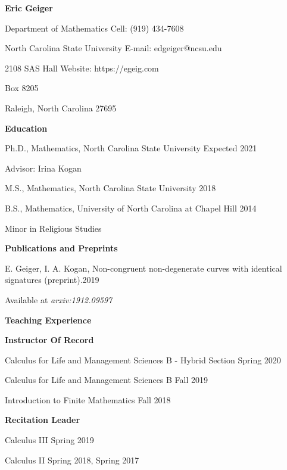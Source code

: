 \documentclass{article}
\begin{document}
\textsf{\textbf{\LARGE Eric Geiger}}

\bigskip

Department of Mathematics \hfill Cell: (919) 434-7608 

North Carolina State University \hfill E-mail: edgeiger@ncsu.edu

2108 SAS Hall \hfill Website: https://egeig.com 

Box 8205 

Raleigh, North Carolina 27695

\bigskip
\bigskip
\bigskip

\textsf{\textbf{\Large Education} \hrulefill}

\medskip
Ph.D., Mathematics, North Carolina State University \hfill Expected 2021

Advisor: Irina Kogan

\medskip
 M.S., Mathematics, North Carolina State University  \hfill 2018

\medskip
B.S., Mathematics, University of North Carolina at Chapel Hill \hfill 2014

Minor in Religious Studies
        
%
%
\bigskip
\bigskip

\textsf{\textbf{\Large Publications and Preprints} \hrulefill}

\medskip
E. Geiger, I. A. Kogan, Non-congruent non-degenerate curves with identical signatures (preprint).\hfill 2019

Available at \textit{arxiv:1912.09597} 


\bigskip
\bigskip

\textsf{\textbf{\Large Teaching Experience} \hrulefill}

\medskip
\medskip

\textsf{\textbf{Instructor Of Record}}

\medskip
Calculus for Life and Management Sciences B - Hybrid Section \hfill Spring 2020 

Calculus for Life and Management Sciences B \hfill Fall 2019

Introduction to Finite Mathematics \hfill Fall 2018

\medskip
\medskip
\textsf{\textbf{Recitation Leader}}

\medskip 
Calculus III \hfill Spring 2019

Calculus II \hfill Spring 2018, Spring 2017
\end{document}
